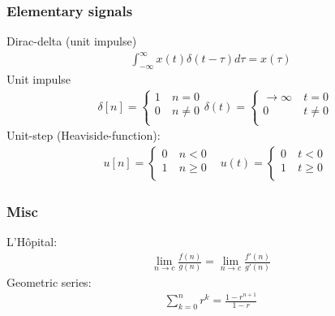 \documentclass[6pt,landscape,a4paper]{article}
\begin{document}
\begin{multicols*}{5}
\subsubsection*{Elementary signals}
Dirac-delta (unit impulse)
\begin{align*}
\textstyle\int_{-\infty}^{\infty} x(t) \delta(t-\tau)d\tau = x(\tau)
\end{align*}
Unit impulse
\begin{align*}
  &\delta[n] = \left\{\begin{array}{cl}
    1 & ~ n = 0   \\
    0 & ~ n \ne 0 \\
  \end{array}
\right.
  \delta(t) = \left\{\begin{array}{cl}
    \rightarrow \infty & ~ t = 0   \\
    0 & ~t \ne 0 \\
  \end{array}
  \right.
\end{align*}
Unit-step (Heaviside-function):
\begin{align*}
&  u[n] = \left\{\begin{array}{cl}
    0 & ~ n < 0   \\
    1 & ~ n \ge 0 \\
  \end{array}
  \right.
&  u(t) = \left\{\begin{array}{cl}
    0 & ~ t < 0   \\
    1 & ~ t \ge 0 \\
  \end{array}
  \right. 
\end{align*}

\subsubsection*{Misc}
L'H\^opital:
\vspace{-2em}
\begin{align*}
\lim_{n\rightarrow c}\frac{f(n)}{g(n)}=\lim_{n\rightarrow c}\frac{f'(n)}{g'(n)}
\end{align*}
\vspace{-1em}
Geometric series:
\begin{align*}
\textstyle\sum_{k=0}^{n} r^k = \frac{1-r^{n+1}}{1-r}
\end{align*}

\end{multicols*}
\end{document}
